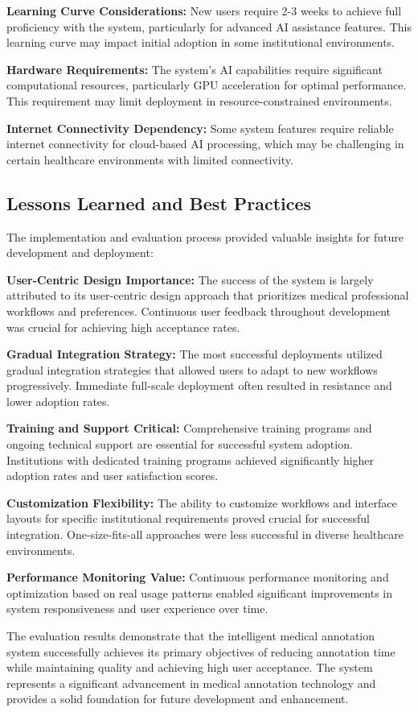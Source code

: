 \textbf{Learning Curve Considerations:} New users require 2-3 weeks to achieve full proficiency with the system, particularly for advanced AI assistance features. This learning curve may impact initial adoption in some institutional environments.

\textbf{Hardware Requirements:} The system's AI capabilities require significant computational resources, particularly GPU acceleration for optimal performance. This requirement may limit deployment in resource-constrained environments.

\textbf{Internet Connectivity Dependency:} Some system features require reliable internet connectivity for cloud-based AI processing, which may be challenging in certain healthcare environments with limited connectivity.

\subsection{Lessons Learned and Best Practices}

The implementation and evaluation process provided valuable insights for future development and deployment:

\textbf{User-Centric Design Importance:} The success of the system is largely attributed to its user-centric design approach that prioritizes medical professional workflows and preferences. Continuous user feedback throughout development was crucial for achieving high acceptance rates.

\textbf{Gradual Integration Strategy:} The most successful deployments utilized gradual integration strategies that allowed users to adapt to new workflows progressively. Immediate full-scale deployment often resulted in resistance and lower adoption rates.

\textbf{Training and Support Critical:} Comprehensive training programs and ongoing technical support are essential for successful system adoption. Institutions with dedicated training programs achieved significantly higher adoption rates and user satisfaction scores.

\textbf{Customization Flexibility:} The ability to customize workflows and interface layouts for specific institutional requirements proved crucial for successful integration. One-size-fits-all approaches were less successful in diverse healthcare environments.

\textbf{Performance Monitoring Value:} Continuous performance monitoring and optimization based on real usage patterns enabled significant improvements in system responsiveness and user experience over time.

The evaluation results demonstrate that the intelligent medical annotation system successfully achieves its primary objectives of reducing annotation time while maintaining quality and achieving high user acceptance. The system represents a significant advancement in medical annotation technology and provides a solid foundation for future development and enhancement. 